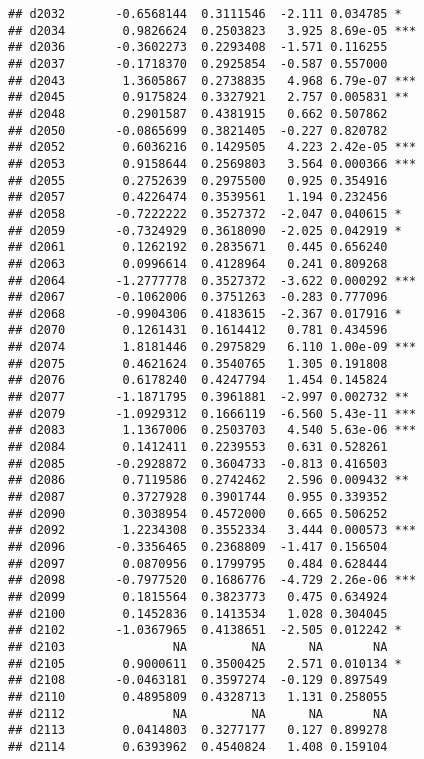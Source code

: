 \documentclass[
]{article}
\begin{document}
\begin{verbatim}
## d2032       -0.6568144  0.3111546  -2.111 0.034785 *  
## d2034        0.9826624  0.2503823   3.925 8.69e-05 ***
## d2036       -0.3602273  0.2293408  -1.571 0.116255    
## d2037       -0.1718370  0.2925854  -0.587 0.557000    
## d2043        1.3605867  0.2738835   4.968 6.79e-07 ***
## d2045        0.9175824  0.3327921   2.757 0.005831 ** 
## d2048        0.2901587  0.4381915   0.662 0.507862    
## d2050       -0.0865699  0.3821405  -0.227 0.820782    
## d2052        0.6036216  0.1429505   4.223 2.42e-05 ***
## d2053        0.9158644  0.2569803   3.564 0.000366 ***
## d2055        0.2752639  0.2975500   0.925 0.354916    
## d2057        0.4226474  0.3539561   1.194 0.232456    
## d2058       -0.7222222  0.3527372  -2.047 0.040615 *  
## d2059       -0.7324929  0.3618090  -2.025 0.042919 *  
## d2061        0.1262192  0.2835671   0.445 0.656240    
## d2063        0.0996614  0.4128964   0.241 0.809268    
## d2064       -1.2777778  0.3527372  -3.622 0.000292 ***
## d2067       -0.1062006  0.3751263  -0.283 0.777096    
## d2068       -0.9904306  0.4183615  -2.367 0.017916 *  
## d2070        0.1261431  0.1614412   0.781 0.434596    
## d2074        1.8181446  0.2975829   6.110 1.00e-09 ***
## d2075        0.4621624  0.3540765   1.305 0.191808    
## d2076        0.6178240  0.4247794   1.454 0.145824    
## d2077       -1.1871795  0.3961881  -2.997 0.002732 ** 
## d2079       -1.0929312  0.1666119  -6.560 5.43e-11 ***
## d2083        1.1367006  0.2503703   4.540 5.63e-06 ***
## d2084        0.1412411  0.2239553   0.631 0.528261    
## d2085       -0.2928872  0.3604733  -0.813 0.416503    
## d2086        0.7119586  0.2742462   2.596 0.009432 ** 
## d2087        0.3727928  0.3901744   0.955 0.339352    
## d2090        0.3038954  0.4572000   0.665 0.506252    
## d2092        1.2234308  0.3552334   3.444 0.000573 ***
## d2096       -0.3356465  0.2368809  -1.417 0.156504    
## d2097        0.0870956  0.1799795   0.484 0.628444    
## d2098       -0.7977520  0.1686776  -4.729 2.26e-06 ***
## d2099        0.1815564  0.3823773   0.475 0.634924    
## d2100        0.1452836  0.1413534   1.028 0.304045    
## d2102       -1.0367965  0.4138651  -2.505 0.012242 *  
## d2103               NA         NA      NA       NA    
## d2105        0.9000611  0.3500425   2.571 0.010134 *  
## d2108       -0.0463181  0.3597274  -0.129 0.897549    
## d2110        0.4895809  0.4328713   1.131 0.258055    
## d2112               NA         NA      NA       NA    
## d2113        0.0414803  0.3277177   0.127 0.899278    
## d2114        0.6393962  0.4540824   1.408 0.159104    

\end{verbatim}
\end{document}
